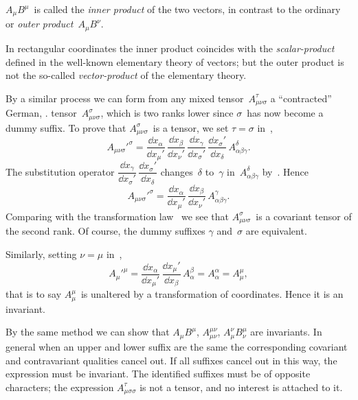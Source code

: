 \documentclass[12pt]{book}
\begin{document}
$A_{\mu}B^{\mu}$~is called the \emph{inner product} of the two vectors, in contrast to the
%
%
%
%
ordinary or \emph{outer product}~$A_{\mu}B^{\nu}$.

In rectangular coordinates the inner product coincides with the \emph{scalar\hyp{}product}
defined in the well\hyp{}known elementary theory of vectors; but the outer
product is not the so-called \emph{vector\hyp{}product} of the elementary theory.

By a similar process we can form from any mixed tensor~$A_{\mu\nu\sigma}^{\tau}$ a ``contracted\footnotemark''\footnotetext
  {German, .}%
tensor~$A_{\mu\nu\sigma}^{\sigma}$, which is two ranks lower since $\sigma$~has now become a
dummy suffix. To prove that $A_{\mu\nu\sigma}^{\sigma}$~is a tensor, we set $\tau = \sigma$ in~,
\[
A_{\mu\nu\sigma}'^{\sigma}
= \frac{\dd x_{\alpha}}{\dd x_{\mu}'}\,
  \frac{\dd x_{\beta}}{\dd x_{\nu}'}\,
  \frac{\dd x_{\gamma}}{\dd x_{\sigma}'}\,
  \frac{\dd x_{\sigma}'}{\dd x_{\delta}}\, A_{\alpha\beta\gamma}^{\delta}.
\]
The substitution operator $\dfrac{\dd x_{\gamma}}{\dd x_{\sigma}'}\, \dfrac{\dd x_{\sigma}'}{\dd x_{\delta}}$ changes~$\delta$ to~$\gamma$ in~$A_{\alpha\beta\gamma}^{\delta}$ by~. Hence
\[
A_{\mu\nu\sigma}'^{\sigma}
= \frac{\dd x_{\alpha}}{\dd x_{\mu}'}\,
  \frac{\dd x_{\beta}}{\dd x_{\nu}'}\, A_{\alpha\beta\gamma}^{\gamma}.
\]
Comparing with the transformation law~ we see that $A_{\mu\nu\sigma}^{\sigma}$~is a covariant
tensor of the second rank. Of course, the dummy suffixes $\gamma$ and~$\sigma$ are equivalent.

Similarly, setting $\nu = \mu$ in~,
\[
A_{\mu}'^{\mu}
= \frac{\dd x_{\alpha}}{\dd x_{\mu}'}\,
  \frac{\dd x_{\mu}'}{\dd x_{\beta}}\, A_{\alpha}^{\beta}
= A_{\alpha}^{\alpha} = A_{\mu}^{\mu},
\]
that is to say $A_{\mu}^{\mu}$~is unaltered by a transformation of coordinates. Hence it
is an invariant.

By the same method we can show that $A_{\mu}B^{\mu}$, $A_{\mu\nu}^{\mu\nu}$, $A_{\mu}^{\nu}B_{\nu}^{\mu}$ are invariants.
In general when an upper and lower suffix are the same the corresponding
covariant and contravariant qualities cancel out. If all suffixes cancel out in
this way, the expression must be invariant. The identified suffixes must be
of opposite characters; the expression $A_{\mu\sigma\sigma}^{\tau}$ is not a tensor, and no interest
is attached to it.
\end{document}
